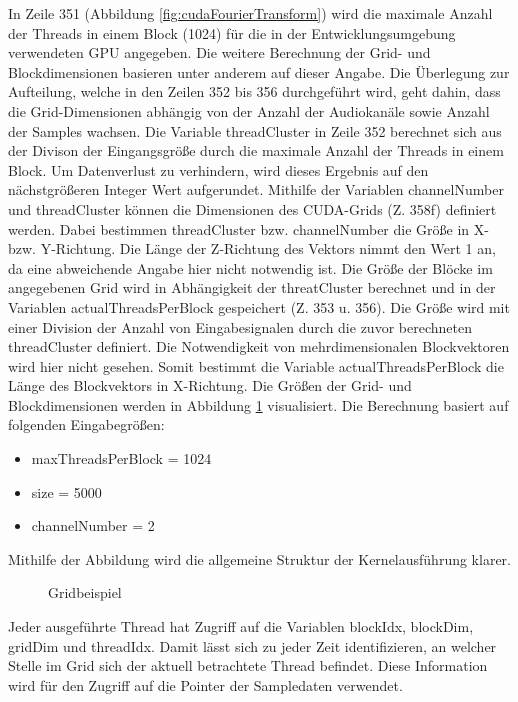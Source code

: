 In Zeile 351 (Abbildung \ref{fig:cudaFourierTransform}) wird die maximale Anzahl der Threads in einem Block (1024) für die in der Entwicklungsumgebung verwendeten GPU angegeben. Die weitere Berechnung der Grid- und Blockdimensionen basieren unter anderem auf dieser Angabe. Die Überlegung zur Aufteilung, welche in den Zeilen 352 bis 356 durchgeführt wird, geht dahin, dass die Grid-Dimensionen abhängig von der Anzahl der Audiokanäle sowie Anzahl der Samples wachsen.
Die Variable threadCluster in Zeile 352 berechnet sich aus der Divison der Eingangsgröße durch die maximale Anzahl der Threads in einem Block. Um Datenverlust zu verhindern, wird dieses Ergebnis auf den nächstgrößeren Integer Wert aufgerundet. Mithilfe der Variablen channelNumber und threadCluster können die Dimensionen des CUDA-Grids (Z. 358f) definiert werden. Dabei bestimmen threadCluster bzw. channelNumber die Größe in X- bzw. Y-Richtung. Die Länge der Z-Richtung des Vektors nimmt den Wert 1 an, da eine abweichende Angabe hier nicht notwendig ist. Die Größe der Blöcke im angegebenen Grid wird in Abhängigkeit der threatCluster berechnet und in der Variablen actualThreadsPerBlock gespeichert (Z. 353 u. 356). Die Größe wird mit einer Division der Anzahl von Eingabesignalen durch die zuvor berechneten threadCluster definiert. Die Notwendigkeit von mehrdimensionalen Blockvektoren wird hier nicht gesehen. Somit bestimmt die Variable actualThreadsPerBlock die Länge des Blockvektors in X-Richtung. Die Größen der Grid- und Blockdimensionen werden in Abbildung  \ref{fig:exampleGrid} visualisiert. Die Berechnung basiert auf folgenden Eingabegrößen:

\begin{itemize}
	\item maxThreadsPerBlock = 1024
	\item size = 5000
	\item channelNumber = 2
\end{itemize}

Mithilfe der Abbildung wird die allgemeine Struktur der Kernelausführung klarer.
\newpage
\begin{figure}[h!]
	\centering      
	\def\svgscale{0.75}
	
	\caption{Gridbeispiel}
	\label{fig:exampleGrid}
\end{figure}

Jeder ausgeführte Thread hat Zugriff auf die Variablen blockIdx, blockDim, gridDim und threadIdx. Damit lässt sich zu jeder Zeit identifizieren, an welcher Stelle im Grid sich der aktuell betrachtete Thread befindet. Diese Information wird für den Zugriff auf die Pointer der Sampledaten verwendet. 

